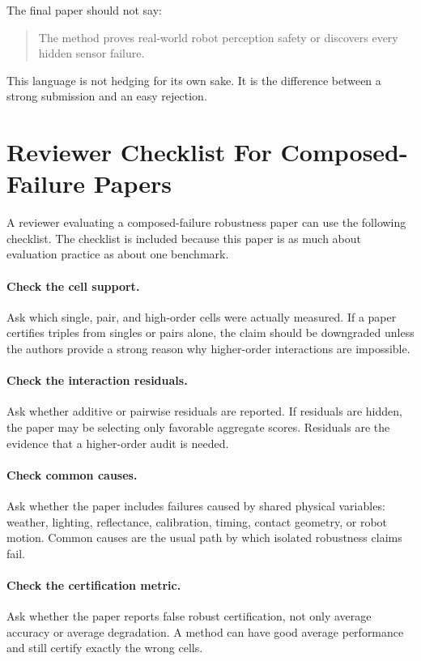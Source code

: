 \documentclass{article}
\begin{document}
The final paper should not say:
\begin{quote}
The method proves real-world robot perception safety or discovers every hidden sensor failure.
\end{quote}

This language is not hedging for its own sake. It is the difference between a strong submission and an easy rejection.

\section{Reviewer Checklist For Composed-Failure Papers}

A reviewer evaluating a composed-failure robustness paper can use the following checklist. The checklist is included because this paper is as much about evaluation practice as about one benchmark.

\paragraph{Check the cell support.}
Ask which single, pair, and high-order cells were actually measured. If a paper certifies triples from singles or pairs alone, the claim should be downgraded unless the authors provide a strong reason why higher-order interactions are impossible.

\paragraph{Check the interaction residuals.}
Ask whether additive or pairwise residuals are reported. If residuals are hidden, the paper may be selecting only favorable aggregate scores. Residuals are the evidence that a higher-order audit is needed.

\paragraph{Check common causes.}
Ask whether the paper includes failures caused by shared physical variables: weather, lighting, reflectance, calibration, timing, contact geometry, or robot motion. Common causes are the usual path by which isolated robustness claims fail.

\paragraph{Check the certification metric.}
Ask whether the paper reports false robust certification, not only average accuracy or average degradation. A method can have good average performance and still certify exactly the wrong cells.
\end{document}
